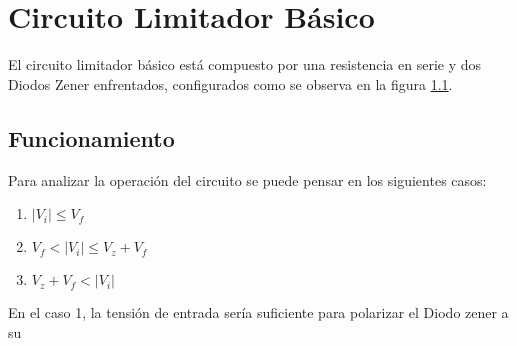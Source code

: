 \chapter{Circuito Limitador Básico}
El circuito limitador básico está compuesto por una resistencia en serie y dos Diodos Zener enfrentados, configurados como se observa en la figura \ref{fig:limitador_basico}.

\begin{figure}[ht]
    \begin{center}
        
        \label{fig:limitador_basico}
    \end{center}
\end{figure}

\section{Funcionamiento}
Para analizar la operación del circuito se puede pensar en los siguientes casos:

\begin{enumerate}
    \item $|V_i| \leq V_f$
    \item $V_f < |V_i| \leq V_z + V_f$
    \item $V_z + V_f < |V_i|$ 
\end{enumerate}

En el caso 1, la tensión de entrada sería suficiente para polarizar el Diodo zener a su 